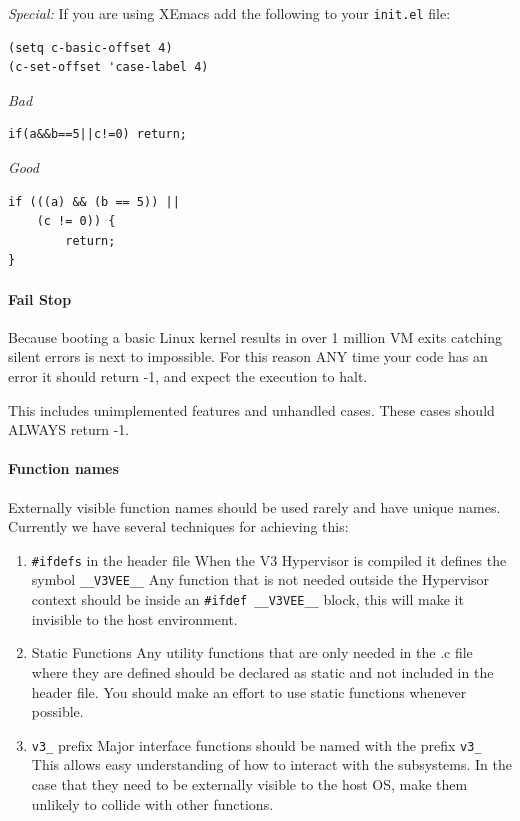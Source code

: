 \documentclass[11pt]{article}
\begin{document}
{\em Special:} If you are using XEmacs add the following to your \verb!init.el! file:
\begin{verbatim}
(setq c-basic-offset 4)
(c-set-offset 'case-label 4)
\end{verbatim}

{\em Bad}
\begin{verbatim}
if(a&&b==5||c!=0) return;
\end{verbatim}


{\em Good}
\begin{verbatim}
if (((a) && (b == 5)) || 
    (c != 0)) {
       	return;
}
\end{verbatim}



\paragraph*{Fail Stop}
Because booting a basic Linux kernel results in over 1 million VM exits
catching silent errors is next to impossible. For this reason
ANY time your code has an error it should return -1, and expect the
execution to halt. 

This includes unimplemented features and unhandled cases. These cases
should ALWAYS return -1. 


\paragraph*{Function names}
Externally visible function names should be used rarely and have
unique names. Currently we have several techniques for achieving this:

\begin{enumerate}
\item \verb.#ifdefs. in the header file
\newline
When the V3 Hypervisor is compiled it defines the symbol
\verb.__V3VEE__. Any function that is not needed outside the Hypervisor
context should be inside an \verb.#ifdef __V3VEE__. block, this will make it
invisible to the host environment.

\item Static Functions
\newline
Any utility functions that are only needed in the .c file where they
are defined should be declared as static and not included in the
header file. You should make an effort to use static functions
whenever possible. 

\item \verb.v3_. prefix \newline Major interface functions should be
  named with the prefix \verb.v3_. This allows easy understanding of
  how to interact with the subsystems.  In the case that they need to
  be externally visible to the host OS, make them unlikely to collide
  with other functions.
\end{enumerate}
\end{document}
